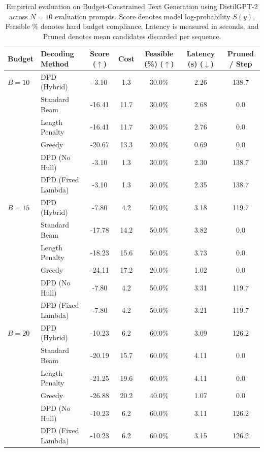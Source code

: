 \begin{table}[t]
\centering
\small
\caption{Empirical evaluation on Budget-Constrained Text Generation using DistilGPT-2 across $N=10$ evaluation prompts. Score denotes model log-probability $S(y)$, Feasible \% denotes hard budget compliance, Latency is measured in seconds, and Pruned denotes mean candidates discarded per sequence.}
\label{tab:lm_results}
\begin{tabular}{llccccc}
\toprule
Budget & Decoding Method & Score ($\uparrow$) & Cost & Feasible (\%) ($\uparrow$) & Latency (s) ($\downarrow$) & Pruned / Step \\
\midrule
$B=10$ & DPD (Hybrid) & -3.10 & 1.3 & 30.0\% & 2.26 & 138.7 \\
 & Standard Beam & -16.41 & 11.7 & 30.0\% & 2.68 & 0.0 \\
 & Length Penalty & -16.41 & 11.7 & 30.0\% & 2.76 & 0.0 \\
 & Greedy & -20.67 & 13.3 & 20.0\% & 0.69 & 0.0 \\
 & DPD (No Hull) & -3.10 & 1.3 & 30.0\% & 2.30 & 138.7 \\
 & DPD (Fixed Lambda) & -3.10 & 1.3 & 30.0\% & 2.35 & 138.7 \\
\midrule
$B=15$ & DPD (Hybrid) & -7.80 & 4.2 & 50.0\% & 3.18 & 119.7 \\
 & Standard Beam & -17.78 & 14.2 & 50.0\% & 3.82 & 0.0 \\
 & Length Penalty & -18.23 & 15.6 & 50.0\% & 3.73 & 0.0 \\
 & Greedy & -24.11 & 17.2 & 20.0\% & 1.02 & 0.0 \\
 & DPD (No Hull) & -7.80 & 4.2 & 50.0\% & 3.31 & 119.7 \\
 & DPD (Fixed Lambda) & -7.80 & 4.2 & 50.0\% & 3.21 & 119.7 \\
\midrule
$B=20$ & DPD (Hybrid) & -10.23 & 6.2 & 60.0\% & 3.09 & 126.2 \\
 & Standard Beam & -20.19 & 15.7 & 60.0\% & 4.11 & 0.0 \\
 & Length Penalty & -21.25 & 19.6 & 60.0\% & 4.11 & 0.0 \\
 & Greedy & -26.88 & 20.2 & 40.0\% & 1.07 & 0.0 \\
 & DPD (No Hull) & -10.23 & 6.2 & 60.0\% & 3.11 & 126.2 \\
 & DPD (Fixed Lambda) & -10.23 & 6.2 & 60.0\% & 3.15 & 126.2 \\
\bottomrule
\end{tabular}
\end{table}
